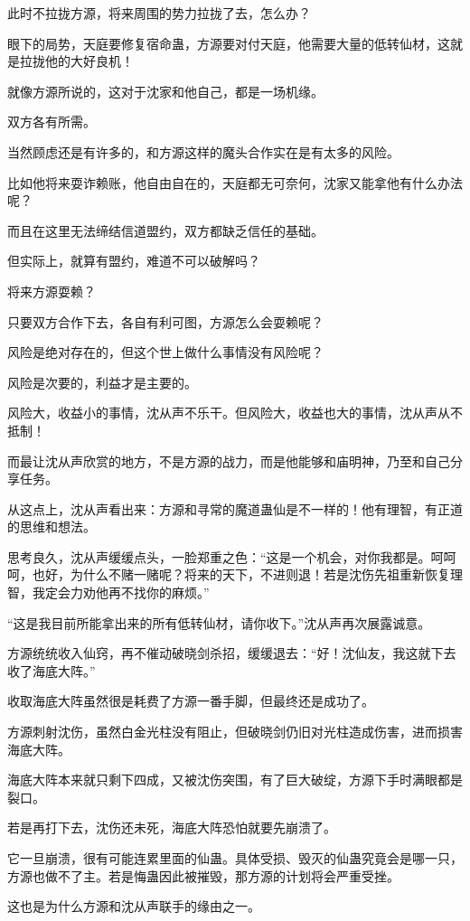 \begin{this_body}
此时不拉拢方源，将来周围的势力拉拢了去，怎么办？

眼下的局势，天庭要修复宿命蛊，方源要对付天庭，他需要大量的低转仙材，这就是拉拢他的大好良机！

就像方源所说的，这对于沈家和他自己，都是一场机缘。

双方各有所需。

当然顾虑还是有许多的，和方源这样的魔头合作实在是有太多的风险。

比如他将来耍诈赖账，他自由自在的，天庭都无可奈何，沈家又能拿他有什么办法呢？

而且在这里无法缔结信道盟约，双方都缺乏信任的基础。

但实际上，就算有盟约，难道不可以破解吗？

将来方源耍赖？

只要双方合作下去，各自有利可图，方源怎么会耍赖呢？

风险是绝对存在的，但这个世上做什么事情没有风险呢？

风险是次要的，利益才是主要的。

风险大，收益小的事情，沈从声不乐干。但风险大，收益也大的事情，沈从声从不抵制！

而最让沈从声欣赏的地方，不是方源的战力，而是他能够和庙明神，乃至和自己分享任务。

从这点上，沈从声看出来：方源和寻常的魔道蛊仙是不一样的！他有理智，有正道的思维和想法。

思考良久，沈从声缓缓点头，一脸郑重之色：“这是一个机会，对你我都是。呵呵呵，也好，为什么不赌一赌呢？将来的天下，不进则退！若是沈伤先祖重新恢复理智，我定会力劝他再不找你的麻烦。”

“这是我目前所能拿出来的所有低转仙材，请你收下。”沈从声再次展露诚意。

方源统统收入仙窍，再不催动破晓剑杀招，缓缓退去：“好！沈仙友，我这就下去收了海底大阵。”

收取海底大阵虽然很是耗费了方源一番手脚，但最终还是成功了。

方源刺射沈伤，虽然白金光柱没有阻止，但破晓剑仍旧对光柱造成伤害，进而损害海底大阵。

海底大阵本来就只剩下四成，又被沈伤突围，有了巨大破绽，方源下手时满眼都是裂口。

若是再打下去，沈伤还未死，海底大阵恐怕就要先崩溃了。

它一旦崩溃，很有可能连累里面的仙蛊。具体受损、毁灭的仙蛊究竟会是哪一只，方源也做不了主。若是悔蛊因此被摧毁，那方源的计划将会严重受挫。

这也是为什么方源和沈从声联手的缘由之一。


\end{this_body}
